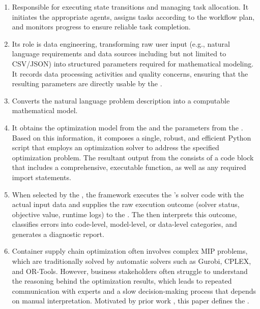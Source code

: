 \documentclass[preprint,12pt]{elsarticle}
\begin{document}
\begin{enumerate}[label=\arabic*)]
 \item {} Responsible for executing state transitions and managing task allocation. It initiates the appropriate agents, assigns tasks according to the workflow plan, and monitors progress to ensure reliable task completion.
 \item {} Its role is data engineering, transforming raw user input (e.g., natural language requirements and data sources including but not limited to CSV/JSON) into structured parameters required for mathematical modeling. It records data processing activities and quality concerns, ensuring that the resulting parameters are directly usable by the .
 \item {} Converts the natural language problem description into a computable mathematical model.
 \item {} It obtains the optimization model from the  and the parameters from the . Based on this information, it composes a single, robust, and efficient Python script that employs an optimization solver to address the specified optimization problem. The resultant output from the  consists of a code block that includes a comprehensive, executable function, as well as any required import statements.
 \item {} When selected by the , the framework executes the 's solver code with the actual input data and supplies the raw execution outcome (solver status, objective value, runtime logs) to the . The  then interprets this outcome, classifies errors into code-level, model-level, or data-level categories, and generates a diagnostic report.
 \item {} Container supply chain optimization often involves complex MIP problems, which are traditionally solved by automatic solvers such as Gurobi, CPLEX, and OR-Tools. However, business stakeholders often struggle to understand the reasoning behind the optimization results, which leads to repeated communication with experts and a slow decision-making process that depends on manual interpretation. Motivated by prior work \citep{liLargeLanguageModels2023}, this paper defines the .
\end{enumerate}
\end{document}
